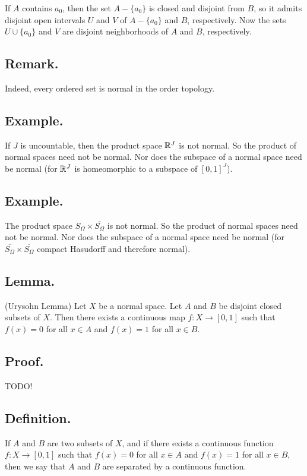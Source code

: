\documentclass[titlepage]{article}
\begin{document}
If $A$ contains $a_{0}$, then the set $A - \{a_{0}\}$ is closed and disjoint from $B$, so it admits disjoint open intervals $U$ and $V$ of $A - \{a_{0}\}$ and $B$, respectively. Now the sets $U \cup \{a_{0}\}$ and $V$ are disjoint neighborhoods of $A$ and $B$, respectively.

\subsection{Remark.} Indeed, every ordered set is normal in the order topology.

\subsection{Example.} If $J$ is uncountable, then the product space $\mathbb{R}^{J}$ is not normal. So the product of normal spaces need not be normal. Nor does the subspace of a normal space need be normal (for $\mathbb{R}^{J}$ is homeomorphic to a subspace of $[0, 1]^{J}$).

\subsection{Example.} The product space $S_{\Omega} \times \overline{S_{\Omega}}$ is not normal. So the product of normal spaces need not be normal. Nor does the subspace of a normal space need be normal (for $\overline{S_{\Omega}} \times \overline{S_{\Omega}}$ compact Hasudorff and therefore normal).

\subsection{Lemma.} (Urysohn Lemma) Let $X$ be a normal space. Let $A$ and $B$ be disjoint closed subsets of $X$. Then there exists a continuous map $f: X \to [0, 1]$ such that $f(x) = 0$ for all $x \in A$ and $f(x) = 1$ for all $x \in B$.

\subsection{Proof.} TODO!

\subsection{Definition.} If $A$ and $B$ are two subsets of $X$, and if there exists a continuous function $f: X \to [0, 1]$ such that $f(x) = 0$ for all $x \in A$ and $f(x) = 1$ for all $x \in B$, then we say that $A$ and $B$ are separated by a continuous function.
\end{document}

